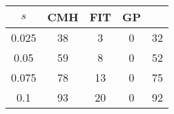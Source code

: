 \centering \begin{tabular}{c|c|c|c|c}
$s$	&CMH	&FIT	&GP	&\sc{Clear}\\\hline
0.025	&38	&3	&0	&32\\
0.05	&59	&8	&0	&52\\
0.075	&78	&13	&0	&75\\
0.1	&93	&20	&0	&92\\
\end{tabular}
